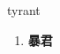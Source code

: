 
\begin{frame}
{\huge tyrant}
\begin{center}
\begin{enumerate}\Large
  \item \textbf{暴君}
\end{enumerate}
\end{center}
\end{frame}
